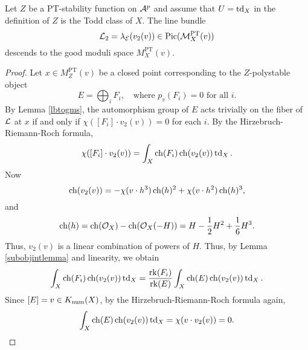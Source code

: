 \begin{prop}\label{L2descendstogms}
Let $Z$ be a PT-stability function on $\mathcal{A}^p$ and assume that $U = \operatorname{\mathrm{td}}_X$ in the definition of $Z$ is the Todd class of $X$. The line bundle 
\[ \mathcal{L}_2 = \lambda_{\mathcal{E}}(v_2(v)) \in \mathrm{Pic}(\mathcal{M}^{\text{PT}}_X(v)) \]
descends to the good moduli space $M^{\text{PT}}_X(v)$.
\end{prop}
\begin{proof}
Let $x \in M^{\text{PT}}_Z(v)$ be a closed point corresponding to the $Z$-polystable object
\[ E = \bigoplus_i F_i, \quad \text{where } p_v(F_i) = 0 \text{ for all } i. \]
By Lemma \ref{lbtogms}, the automorphism group of $E$ acts trivially on the fiber of $\mathcal{L}$ at $x$ if and only if $\chi([F_i]\cdot v_2(v)) = 0$ for each $i$. By the Hirzebruch-Riemann-Roch formula,
\[ \chi([F_i]\cdot v_2(v)) = \int_X \operatorname{\mathrm{ch}}(F_i) \operatorname{\mathrm{ch}}(v_2(v)) \operatorname{\mathrm{td}}_X. \]
Now
\[ \operatorname{\mathrm{ch}}(v_2(v)) =  -\chi(v \cdot h^3) \operatorname{\mathrm{ch}}(h)^2 + \chi(v \cdot h^2) \operatorname{\mathrm{ch}}(h)^3, \]
and
\[ \operatorname{\mathrm{ch}}(h) = \operatorname{\mathrm{ch}}(\mathcal{O}_X) - \operatorname{\mathrm{ch}}(\mathcal{O}_X(-H)) = H - \frac{1}{2} H^2 + \frac{1}{6} H^3. \]
Thus, $v_2(v)$ is a linear combination of powers of $H$. Thus, by Lemma \ref{subobjintlemma} and linearity, we obtain
\[ \int_X \operatorname{\mathrm{ch}}(F_i) \operatorname{\mathrm{ch}}(v_2(v)) \operatorname{\mathrm{td}}_X = \frac{\operatorname{\mathrm{rk}}(F_i)}{\operatorname{\mathrm{rk}}(E)} \int_X \operatorname{\mathrm{ch}}(E) \operatorname{\mathrm{ch}}(v_2(v)) \operatorname{\mathrm{td}}_X. \]
Since $[E] = v \in K_{\mathrm{num}}(X)$, by the Hirzebruch-Riemann-Roch formula again,
\[ \int_X \operatorname{\mathrm{ch}}(E) \operatorname{\mathrm{ch}}(v_2(v)) \operatorname{\mathrm{td}}_X = \chi(v \cdot v_2(v)) = 0. \] 
\end{proof}

